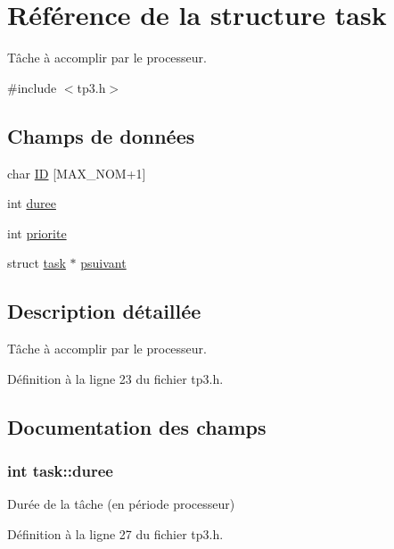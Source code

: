 \hypertarget{structtask}{
\section{\-Référence de la structure task}
\label{structtask}
}


\-Tâche à accomplir par le processeur.  




{\ttfamily \#include $<$tp3.\-h$>$}

\subsection*{\-Champs de données}
\begin{DoxyCompactItemize}
\item 
char \hyperlink{structtask_a8d5cab5aec1912aa7a0c48ec8b587c29}{\-I\-D} \mbox{[}\-M\-A\-X\-\_\-\-N\-O\-M+1\mbox{]}
\item 
int \hyperlink{structtask_adbe42846faf72d16a8b41b5876c28f97}{duree}
\item 
int \hyperlink{structtask_ac69cbf3c1c4c28c5b6dca044cd0601ef}{priorite}
\item 
struct \hyperlink{structtask}{task} $\ast$ \hyperlink{structtask_a4f77f9c66de469188601035b9f343680}{psuivant}
\end{DoxyCompactItemize}


\subsection{\-Description détaillée}
\-Tâche à accomplir par le processeur. 

\-Définition à la ligne 23 du fichier tp3.\-h.



\subsection{\-Documentation des champs}
\hypertarget{structtask_adbe42846faf72d16a8b41b5876c28f97}{
\subsubsection[{duree}]{\setlength{\rightskip}{0pt plus 5cm}int {\bf task\-::duree}}}
\label{structtask_adbe42846faf72d16a8b41b5876c28f97}
\-Durée de la tâche (en période processeur) 

\-Définition à la ligne 27 du fichier tp3.\-h.

